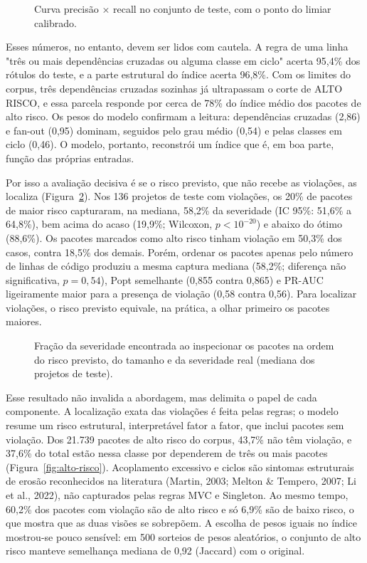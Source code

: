 \documentclass[
  a4paper,
]{article}
\begin{document}
\begin{figure}[htbp]
\centering

\caption{Curva precisão × recall no conjunto de teste, com o ponto do limiar calibrado.}
\label{fig:pr}
\end{figure}

Esses números, no entanto, devem ser lidos com cautela. A regra de uma linha "três ou mais dependências cruzadas ou alguma classe em ciclo" acerta 95,4\% dos rótulos do teste, e a parte estrutural do índice acerta 96,8\%. Com os limites do corpus, três dependências cruzadas sozinhas já ultrapassam o corte de ALTO RISCO, e essa parcela responde por cerca de 78\% do índice médio dos pacotes de alto risco. Os pesos do modelo confirmam a leitura: dependências cruzadas (2,86) e fan-out (0,95) dominam, seguidos pelo grau médio (0,54) e pelas classes em ciclo (0,46). O modelo, portanto, reconstrói um índice que é, em boa parte, função das próprias entradas.

Por isso a avaliação decisiva é se o risco previsto, que não recebe as violações, as localiza (Figura~\ref{fig:ganho}). Nos 136 projetos de teste com violações, os 20\% de pacotes de maior risco capturaram, na mediana, 58,2\% da severidade (IC 95\%: 51,6\% a 64,8\%), bem acima do acaso (19,9\%; Wilcoxon, $p < 10^{-20}$) e abaixo do ótimo (88,6\%). Os pacotes marcados como alto risco tinham violação em 50,3\% dos casos, contra 18,5\% dos demais. Porém, ordenar os pacotes apenas pelo número de linhas de código produziu a mesma captura mediana (58,2\%; diferença não significativa, $p = 0{,}54$), Popt semelhante (0,855 contra 0,865) e PR-AUC ligeiramente maior para a presença de violação (0,58 contra 0,56). Para localizar violações, o risco previsto equivale, na prática, a olhar primeiro os pacotes maiores.

\begin{figure}[htbp]
\centering

\caption{Fração da severidade encontrada ao inspecionar os pacotes na ordem do risco previsto, do tamanho e da severidade real (mediana dos projetos de teste).}
\label{fig:ganho}
\end{figure}

Esse resultado não invalida a abordagem, mas delimita o papel de cada componente. A localização exata das violações é feita pelas regras; o modelo resume um risco estrutural, interpretável fator a fator, que inclui pacotes sem violação. Dos 21.739 pacotes de alto risco do corpus, 43,7\% não têm violação, e 37,6\% do total estão nessa classe por dependerem de três ou mais pacotes (Figura~\ref{fig:alto-risco}). Acoplamento excessivo e ciclos são sintomas estruturais de erosão reconhecidos na literatura (Martin, 2003; Melton \& Tempero, 2007; Li et al., 2022), não capturados pelas regras MVC e Singleton. Ao mesmo tempo, 60,2\% dos pacotes com violação são de alto risco e só 6,9\% são de baixo risco, o que mostra que as duas visões se sobrepõem. A escolha de pesos iguais no índice mostrou-se pouco sensível: em 500 sorteios de pesos aleatórios, o conjunto de alto risco manteve semelhança mediana de 0,92 (Jaccard) com o original.
\end{document}
